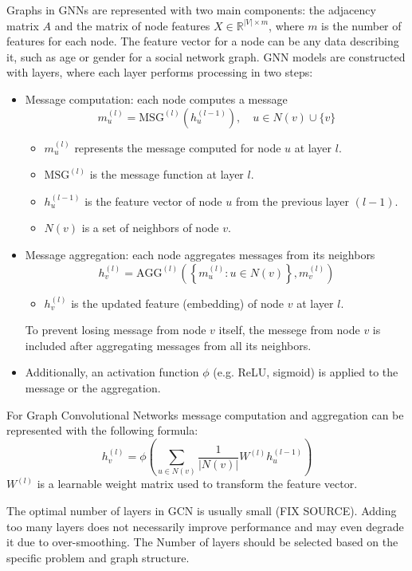 Graphs in GNNs are represented with two main components: the adjacency matrix $A$ and the matrix of node features $X \in \mathbb{R}^{|V| \times m}$, where $m$ is the number of features for each node. The feature vector for a node can be any data describing it, such as age or gender for a social network graph. GNN models are constructed with layers, where each layer performs processing in two steps:
\begin{itemize}
    \item Message computation: each node computes a message 
        \[m_u^{(l)} = \text{MSG}^{(l)}(h_u^{(l-1)}), \quad u \in N(v) \cup \{v\}\]
        \begin{itemize}
            \item $m_u^{(l)}$ represents the message computed for node $u$ at layer $l$.
            \item $\text{MSG}^{(l)}$ is the message function at layer $l$.
            \item $h_u^{(l-1)}$ is the feature vector of node $u$ from the previous layer $(l-1)$.
            \item $N(v)$ is a set of neighbors of node $v$.
        \end{itemize}
    \item Message aggregation: each node aggregates messages from its neighbors
        \[h_v^{(l)} = \text{AGG}^{(l)}\left(\left\{ m_u^{(l)} : u \in N(v) \right\}, m_v^{(l)}\right)\]
        \begin{itemize}
            \item $h_v^{(l)}$ is the updated feature (embedding) of node $v$ at layer $l$. 
        \end{itemize}
        To prevent losing message from node $v$ itself, the messege from node $v$ is included after aggregating messages from all its neighbors.   
    \item Additionally, an activation function $\phi$ (e.g. ReLU, sigmoid) is applied to the message or the aggregation.
\end{itemize}

For Graph Convolutional Networks message computation and aggregation can be represented with the following formula:
\[h_v^{(l)} = \phi \left( \sum_{u \in N(v)} \frac{1}{|N(v)|} W^{(l)} h_u^{(l-1)} \right)\]
$W^{(l)}$ is a learnable weight matrix used to transform the feature vector.

The optimal number of layers in GCN is usually small (FIX SOURCE). Adding too many layers does not necessarily improve performance and may even degrade it due to over-smoothing. The Number of layers should be selected based on the specific problem and graph structure.

